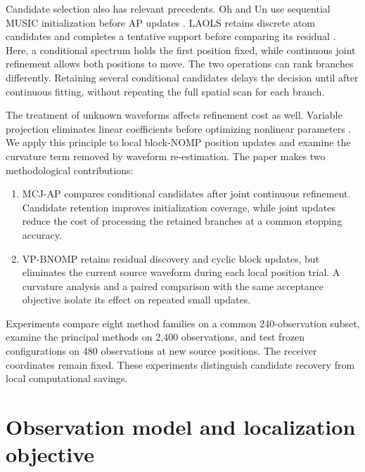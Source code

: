 \documentclass[a4paper,fleqn,review]{cas-sc}
\begin{document}
Candidate selection also has relevant precedents. Oh and Un use sequential MUSIC initialization before AP updates \cite{OhUn1991}. LAOLS retains discrete atom candidates and completes a tentative support before comparing its residual \cite{Chatterjee2012}. Here, a conditional spectrum holds the first position fixed, while continuous joint refinement allows both positions to move. The two operations can rank branches differently. Retaining several conditional candidates delays the decision until after continuous fitting, without repeating the full spatial scan for each branch.

The treatment of unknown waveforms affects refinement cost as well. Variable projection eliminates linear coefficients before optimizing nonlinear parameters \cite{GolubPereyra1973}. We apply this principle to local block-NOMP position updates and examine the curvature term removed by waveform re-estimation. The paper makes two methodological contributions:
\begin{enumerate}
\item MCJ-AP compares conditional candidates after joint continuous refinement. Candidate retention improves initialization coverage, while joint updates reduce the cost of processing the retained branches at a common stopping accuracy.
\item VP-BNOMP retains residual discovery and cyclic block updates, but eliminates the current source waveform during each local position trial. A curvature analysis and a paired comparison with the same acceptance objective isolate its effect on repeated small updates.
\end{enumerate}
Experiments compare eight method families on a common 240-observation subset, examine the principal methods on 2,400 observations, and test frozen configurations on 480 observations at new source positions. The receiver coordinates remain fixed. These experiments distinguish candidate recovery from local computational savings.

\FloatBarrier
\section{Observation model and localization objective}
\FloatBarrier
\end{document}
